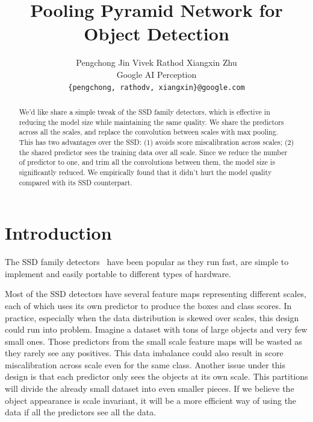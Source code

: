 \documentclass[10pt,twocolumn,letterpaper]{article}
\begin{document}
\title{Pooling Pyramid Network for Object Detection}

\author{
Pengchong Jin
\hspace*{32pt}
Vivek Rathod
\hspace*{32pt}
Xiangxin Zhu
\\
Google AI Perception\\
{\tt\small \{pengchong, rathodv, xiangxin\}@google.com}
}


\maketitle

\begin{abstract}
We'd like share a simple tweak of the SSD family detectors,
  which is effective in reducing the model size while
  maintaining the same quality. We share the predictors
  across all the scales, and replace the convolution between
  scales with max pooling. This has two advantages over the 
  SSD: (1) avoids score miscalibration across scales; (2)
  the shared predictor sees the training data over all
  scale. Since we reduce the number of predictor to one, and
  trim all the convolutions between them, the model size is
  significantly reduced. We empirically found that it didn't
  hurt the model quality compared with its SSD counterpart.

\end{abstract}

\section{Introduction}
The SSD family detectors~\cite{liu2016ssd,lin2017focal} have
been popular as they run fast, are simple to implement
and easily portable to different types of hardware.


Most of the SSD detectors have several feature maps
representing different scales, each of which uses its own
predictor to produce the boxes and class scores.
In practice, especially when the data distribution is skewed
over scales, this design could run into problem. Imagine a
dataset with tons of large objects and very few small ones.
Those predictors from the small scale feature maps will be
wasted as they rarely see any positives. This data imbalance
could also result in score miscalibration across scale even
for the same class. Another issue under this design is that
each predictor only sees the objects at its own scale. This
partitions will divide the already small dataset
into even smaller pieces. If we believe the object
appearance is scale invariant, it will be a more efficient
way of using the data if all the predictors see all the
data.
\end{document}
